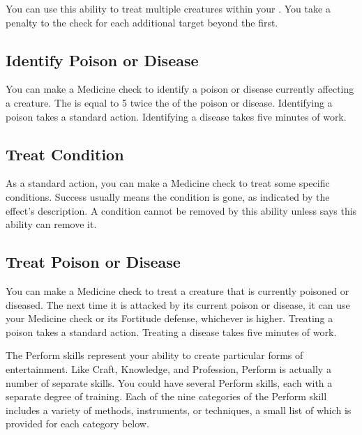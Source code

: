         You can use this ability to treat multiple creatures within your .
        You take a  penalty to the check for each additional target beyond the first.

    \subsection{Identify Poison or Disease}\label{Identify Poison or Disease}
        You can make a Medicine check to identify a poison or disease currently affecting a creature.
        The  is equal to 5 \add twice the  of the poison or disease.
        Identifying a poison takes a standard action.
        Identifying a disease takes five minutes of work.

    \subsection{Treat Condition}\label{Treat Condition}
        As a standard action, you can make a Medicine check to treat some specific conditions.
        Success usually means the condition is gone, as indicated by the effect's description.
        A condition cannot be removed by this ability unless says this ability can remove it.

    \subsection{Treat Poison or Disease}
        You can make a Medicine check to treat a creature that is currently poisoned or diseased.
        The next time it is attacked by its current poison or disease, it can use your Medicine check or its Fortitude defense, whichever is higher.
        Treating a poison takes a standard action.
        Treating a disease takes five minutes of work.

\newpage
{}
    The Perform skills represent your ability to create particular forms of entertainment.
        Like Craft, Knowledge, and Profession, Perform is actually a number of separate skills.
        You could have several Perform skills, each with a separate degree of training.
        Each of the nine categories of the Perform skill includes a variety of methods, instruments, or techniques, a small list of which is provided for each category below.

